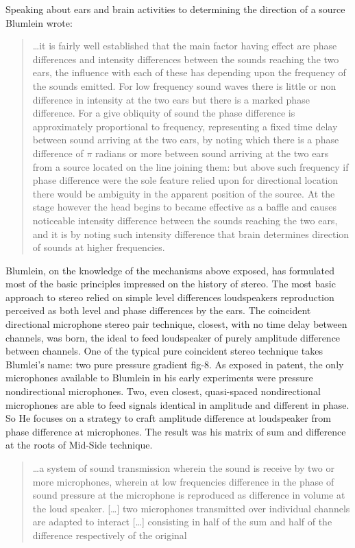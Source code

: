 \documentclass{article}
\begin{document}
Speaking about ears and brain activities to determining the direction of a source Blumlein wrote: 

\begin{quotation}
…it is fairly well established that the main factor having effect are phase
differences and intensity differences between the sounds reaching the two ears,
the influence with each of these has depending upon the frequency of the sounds
emitted. For low frequency sound waves there is little or non difference in
intensity at the two ears but there is a marked phase difference. For a give
obliquity of sound the phase difference is approximately proportional to
frequency, representing a fixed time delay between sound arriving at the two
ears, by noting which there is a phase difference of $\pi$ radians or more between
sound arriving at the two ears from a source located on the line joining them:
but above such frequency if phase difference were the sole feature relied upon
for directional location there would be ambiguity in the apparent position of
the source. At the stage however the head begins to became effective as a baffle
and causes noticeable intensity difference between the sounds reaching the two
ears, and it is by noting such intensity difference that brain determines
direction of sounds at higher frequencies. \cite{ab58}
\end{quotation}

Blumlein, on the knowledge of the mechanisms above exposed, has formulated most of the basic principles impressed on the history of stereo. The most basic approach to stereo relied on simple level differences loudspeakers reproduction perceived as both level and phase differences by the ears. The coincident directional microphone stereo pair technique, closest, with no time delay between channels, was born, the ideal to feed loudspeaker of purely amplitude difference between channels. One of the typical pure coincident stereo technique takes Blumlei's name: two pure pressure gradient fig-8. 
As exposed in patent, the only microphones available to Blumlein in his early experiments were pressure nondirectional microphones. Two, even closest, quasi-spaced nondirectional microphones are able to feed signals identical in amplitude and different in phase. So He focuses on a strategy to craft amplitude difference at loudspeaker from phase difference at microphones. The result was his matrix of sum and difference at the roots of Mid-Side technique.

\begin{quotation}
\ldots a system of sound transmission wherein the sound
is receive by two or more microphones, wherein at low frequencies difference in
the phase of sound pressure at the microphone is reproduced as difference in
volume at the loud speaker. [\ldots] two microphones transmitted over individual channels are adapted to interact [\ldots] consisting in half of the sum and half of the difference respectively of the original \cite{ab58}
\end{quotation}
\end{document}

